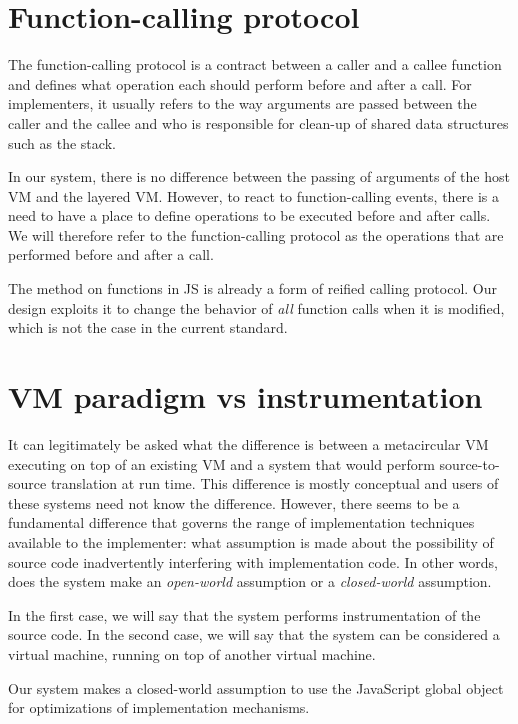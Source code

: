 \section{Function-calling protocol}

The function-calling protocol is a contract between a caller and a callee
function and defines what operation each should perform before and after a
call. For implementers, it usually refers to the way arguments are
passed between the caller and the callee and who is responsible for clean-up of
shared data structures such as the stack.

In our system, there is no difference between the passing of arguments of the
host VM and the layered VM. However, to react to function-calling events, there
is a need to have a place to define operations to be executed before and after
calls. We will therefore refer to the function-calling protocol as the
operations that are performed before and after a call. 

The  method on functions in JS is already a form of reified calling
protocol. Our design exploits it to change the behavior of \textit{all} function
calls when it is modified, which is not the case in the current standard.

\section{VM paradigm vs instrumentation}

It can legitimately be asked what the difference is between a metacircular VM
executing on top of an existing VM and a system that would perform
source-to-source translation at run time. This difference is mostly conceptual
and users of these systems need not know the difference. However, there seems
to be a fundamental difference that governs the range of implementation
techniques available to the implementer: what assumption is made about the
possibility of source code inadvertently interfering with implementation code.
In other words, does the system make an \textit{open-world} assumption or a
\textit{closed-world} assumption.

In the first case, we will say that the system performs instrumentation of the
source code. In the second case, we will say that the system can be considered
a virtual machine, running on top of another virtual machine. 

Our system makes a closed-world assumption to use the JavaScript global object
for optimizations of implementation mechanisms.

